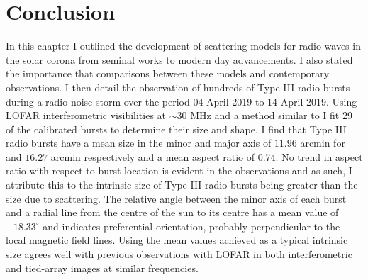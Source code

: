 \section{Conclusion}
In this chapter I outlined the development of scattering models for radio waves in the solar corona from seminal works to modern day advancements. I also stated the importance that comparisons between these models and contemporary observations. I then detail the observation of hundreds of Type III radio bursts during a radio noise storm over the period 04 April 2019 to 14 April 2019. Using LOFAR interferometric visibilities at $\sim 30$ MHz and a method similar to \cite{Murphy2021} I fit 29 of the calibrated bursts to determine their size and shape. I find that Type III radio bursts have a mean size in the minor and major axis of $11.96$ arcmin for and $16.27$ arcmin respectively and a mean aspect ratio of 0.74. No trend in aspect ratio with respect to burst location is evident in the observations and as such, I attribute this to the intrinsic size of Type III radio bursts being greater than the size due to scattering. The relative angle between the minor axis of each burst and a radial line from the centre of the sun to its centre has a mean value of $-18.33^\circ$ and indicates preferential orientation, probably perpendicular to the local magnetic field lines. Using the mean values achieved as a typical intrinsic size agrees well with previous observations with LOFAR in both interferometric and tied-array images at similar frequencies.

